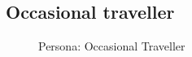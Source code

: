 \documentclass[a4paper,12pt]{report}
\begin{document}
\subsection{Occasional traveller}
\begin{figure}[!htb]
	\caption{\label{fig:occasional_traveller}Persona: Occasional Traveller}	
\end{figure}

\FloatBarrier
\end{document}
